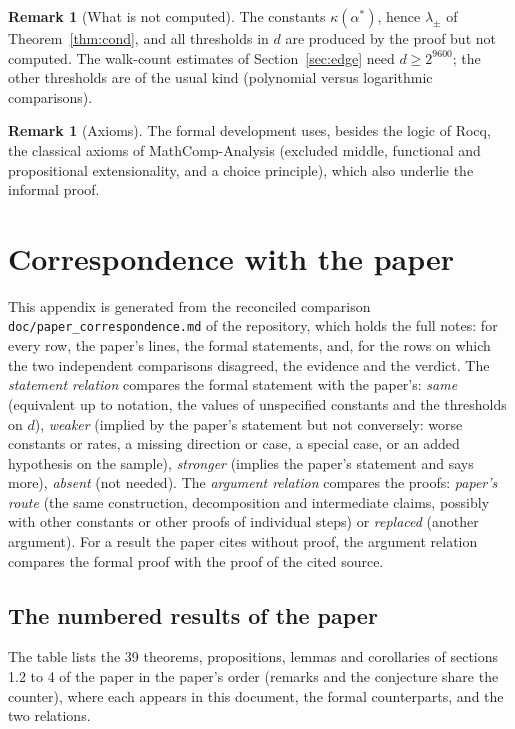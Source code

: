 \documentclass[11pt]{article}
\theoremstyle{plain}
\theoremstyle{definition}
\newtheorem{remark}[theorem]{Remark}
\begin{document}
\begin{remark}[What is not computed]
The constants $\kappa(\alpha^*)$, hence $\lambda_\pm$ of
Theorem~\ref{thm:cond}, and all thresholds in $d$ are produced by the proof
but not computed. The walk-count estimates of Section~\ref{sec:edge} need
$d \ge 2^{9600}$; the other thresholds are of the usual kind (polynomial
versus logarithmic comparisons).
\end{remark}

\begin{remark}[Axioms]
The formal development uses, besides the logic of Rocq, the classical
axioms of MathComp-Analysis (excluded middle, functional and propositional
extensionality, and a choice principle), which also underlie the informal
proof.
\end{remark}

\appendix
\section{Correspondence with the paper}\label{sec:correspondence}

This appendix is generated from the reconciled comparison
\texttt{doc/paper\_correspondence.md} of the repository, which holds the
full notes: for every row, the paper's lines, the formal statements, and,
for the rows on which the two independent comparisons disagreed, the
evidence and the verdict. The \emph{statement relation} compares the
formal statement with the paper's: \emph{same} (equivalent up to
notation, the values of unspecified constants and the thresholds on $d$),
\emph{weaker} (implied by the paper's statement but not conversely: worse
constants or rates, a missing direction or case, a special case, or an
added hypothesis on the sample), \emph{stronger} (implies the paper's
statement and says more), \emph{absent} (not needed). The \emph{argument
relation} compares the proofs: \emph{paper's route} (the same
construction, decomposition and intermediate claims, possibly with other
constants or other proofs of individual steps) or \emph{replaced} (another
argument). For a result the paper cites without proof, the argument
relation compares the formal proof with the proof of the cited source.

\subsection{The numbered results of the paper}\label{sec:corr_table}

The table lists the 39 theorems, propositions, lemmas and corollaries of
sections 1.2 to 4 of the paper in the paper's order (remarks and the
conjecture share the counter), where each appears in this document, the
formal counterparts, and the two relations.
\end{document}
